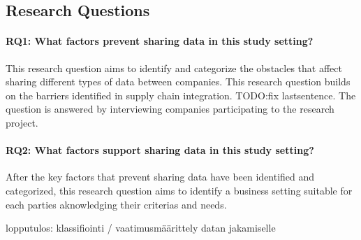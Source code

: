 \subsection{Research Questions}

\paragraph*{RQ1: What factors prevent sharing data in this study setting?}

This research question aims to identify and categorize the obstacles that affect sharing different types of data between companies. This research question builds on the barriers identified in supply chain integration. TODO:fix lastsentence. The question is answered by interviewing companies participating to the research project. 







\paragraph*{RQ2: What factors support sharing data in this study setting?}

After the key factors that prevent sharing data have been identified and categorized, this research question aims to identify a business setting suitable for each parties aknowledging their criterias and needs. 




lopputulos: klassifiointi / vaatimusmäärittely datan jakamiselle




















